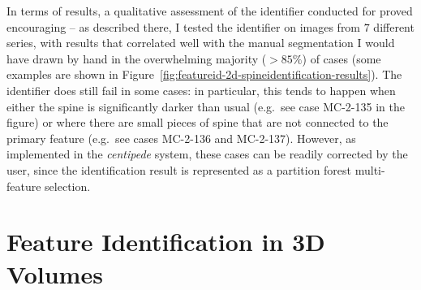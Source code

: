 In terms of results, a qualitative assessment of the identifier conducted for \cite{gvcispa09} proved encouraging -- as described there, I tested the identifier on images from $7$ different series, with results that correlated well with the manual segmentation I would have drawn by hand in the overwhelming majority ($> 85\%$) of cases (some examples are shown in Figure~\ref{fig:featureid-2d-spineidentification-results}). The identifier does still fail in some cases: in particular, this tends to happen when either the spine is significantly darker than usual (e.g.~see case MC-2-135 in the figure) or where there are small pieces of spine that are not connected to the primary feature (e.g.~see cases MC-2-136 and MC-2-137). However, as implemented in the \emph{centipede} system, these cases can be readily corrected by the user, since the identification result is represented as a partition forest multi-feature selection.


\begin{landscape}
\end{landscape}


\afterpage{\clearpage}
\newpage

\section{Feature Identification in 3D Volumes}
\label{sec:featureid-3d}

